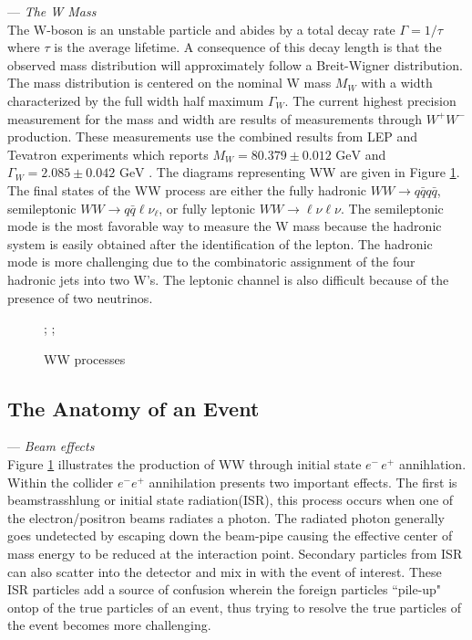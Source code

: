 --- \textit {The W Mass}\\
The W-boson is an unstable particle and abides by a total decay rate $\Gamma = 1/\tau$ where $\tau$ is the average lifetime.  A consequence of this decay length is that the observed mass distribution will approximately follow a Breit-Wigner distribution. The mass distribution is centered on the nominal W mass $M_W$ with a width characterized by the full width half maximum $\Gamma_W$. The current highest precision measurement for the mass and width are results of measurements through $W^+W^-$ production. These measurements use the combined results from LEP and Tevatron experiments which reports $M_W = 80.379 \pm 0.012 \, \, \text{GeV} $ and $\Gamma_W = 2.085 \pm 0.042 \,  \,\text{GeV}$ \cite{pdg}. The diagrams representing WW are given in Figure \ref{fig:wwdiag}. The final states of the WW process are either the fully hadronic $WW\rightarrow q\bar{q}q\bar{q}$, semileptonic $WW\rightarrow q\bar{q}\ell\nu_{\ell}$, or fully leptonic $WW\rightarrow \ell \nu \ell \nu$. The semileptonic mode is the most favorable way to measure the W mass because the hadronic system is easily obtained after the identification of the lepton. The hadronic mode is more challenging due to the combinatoric assignment of the four hadronic jets into two W's. The leptonic channel is also difficult because of the presence of two neutrinos.


\begin{figure}
\centering
{};
    ;
\caption{\label{fig:wwdiag} WW processes }
\end{figure}

  

\subsection{The Anatomy of an Event}
\label{subsec:collphsx}
--- \textit{Beam effects}\\
Figure \ref{fig:wwdiag} illustrates the production of WW through initial state $e^- \, e^+$ annihlation. Within the collider $e^- e^+$ annihilation presents two important effects. The first is beamstrasshlung or initial state radiation(ISR), this process occurs when one of the electron/positron beams radiates a photon. The radiated photon generally goes undetected by escaping down the beam-pipe causing the effective center of mass energy to be reduced at the interaction point. Secondary particles from ISR can also scatter  into the detector and mix in with the event of interest. These ISR particles add a source of confusion wherein the foreign particles ``pile-up"  ontop of the true particles of an event, thus  trying to resolve the true particles of the event becomes more challenging. 

